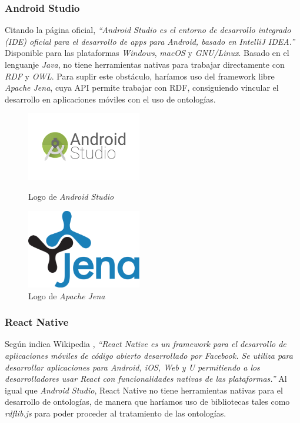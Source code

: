 \subsubsection{Android Studio}
Citando la página oficial, \textit{“Android Studio es el entorno de desarrollo integrado (\textnormal{IDE}) oficial para el desarrollo 
de apps para Android, basado en \textnormal{IntelliJ IDEA}.”} \autocite*{AndroidStudio2019}
Disponible para las plataformas \textit{Windows}, \textit{macOS} y \textit{GNU/Linux}. Basado en el lenguanje \textit{Java},
no tiene herramientas nativas para trabajar directamente con \textit{RDF} y \textit{OWL}. Para suplir este obstáculo, 
haríamos uso del framework libre \textit{Apache Jena}, cuya API permite trabajar con RDF, consiguiendo vincular 
el desarrollo en aplicaciones móviles con el uso de ontologías.

\begin{figure}[H]
    \centering
    \begin{minipage}{5cm}
        \centering
        \includegraphics[width=5cm]{Images/Logo_Android_Studio.png}
        \caption{Logo de \textit{Android Studio}}  
    \end{minipage}
    \hfill
    \begin{minipage}{5cm}
        \centering
        \includegraphics[width=5cm]{Images/Logo_Jena.png}
        \caption{Logo de \textit{Apache Jena}}  
    \end{minipage}
\end{figure}
\newpage
\subsubsection{React Native}
Según indica Wikipedia \autocite*{ReactNative}, \textit{“React Native es un \textit{framework} para el desarrollo de aplicaciones móviles de código abierto desarrollado por 
\textit{Facebook}. Se utiliza para desarrollar aplicaciones para \textit{Android}, \textit{iOS}, \textit{Web} y 
\textit{U} permitiendo a los desarrolladores usar \textit{React} con funcionalidades nativas de las plataformas.”}
Al igual que \textit{Android Studio}, React Native no tiene herramientas nativas para el desarrollo de ontologías, de 
manera que haríamos uso de bibliotecas tales como \textit{rdflib.js} para poder proceder al tratamiento de las ontologías.

